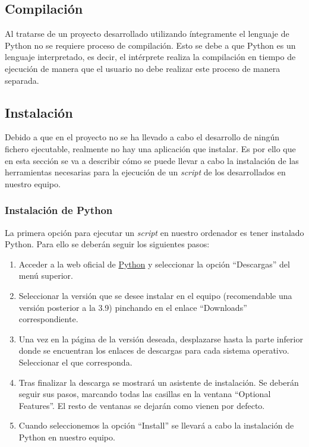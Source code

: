 \subsection{Compilación}

Al tratarse de un proyecto desarrollado utilizando íntegramente el lenguaje de Python no se requiere proceso de compilación. Esto se debe a que Python es un lenguaje interpretado, es decir, el intérprete realiza la compilación en tiempo de ejecución de manera que el usuario no debe realizar este proceso de manera separada.

\subsection{Instalación}

Debido a que en el proyecto no se ha llevado a cabo el desarrollo de ningún fichero ejecutable, realmente no hay una aplicación que instalar. Es por ello que en esta sección se va a describir cómo se puede llevar a cabo la instalación de las herramientas necesarias para la ejecución de un \textit{script} de los desarrollados en nuestro equipo.

\subsubsection{Instalación de Python}

La primera opción para ejecutar un \textit{script} en nuestro ordenador es tener instalado Python. Para ello se deberán seguir los siguientes pasos:

\begin{enumerate}
    \item Acceder a la web oficial de \href{https://www.python.org/}{Python} y seleccionar la opción ``Descargas'' del menú superior.
    \item Seleccionar la versión que se desee instalar en el equipo (recomendable una versión posterior a la 3.9) pinchando en el enlace ``Downloads'' correspondiente.
    \item Una vez en la página de la versión deseada, desplazarse hasta la parte inferior donde se encuentran los enlaces de descargas para cada sistema operativo. Seleccionar el que corresponda. 
    \item Tras finalizar la descarga se mostrará un asistente de instalación. Se deberán seguir sus pasos, marcando todas las casillas en la ventana ``Optional Features''. El resto de ventanas se dejarán como vienen por defecto.
    \item Cuando seleccionemos la opción ``Install'' se llevará a cabo la instalación de Python en nuestro equipo.
\end{enumerate}

